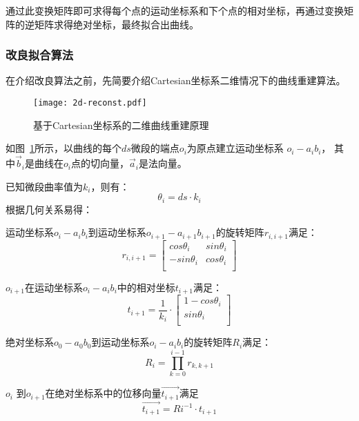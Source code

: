 通过此变换矩阵即可求得每个点的运动坐标系和下个点的相对坐标，再通过变换矩阵的逆矩阵求得绝对坐标\cite{FBG-sensor-devices}，最终拟合出曲线。

\subsubsection{改良拟合算法}

在介绍改良算法之前，先简要介绍Cartesian坐标系二维情况下的曲线重建算法。

\FloatBarrier
\begin{figure}
\centering
\texttt{[image: 2d-reconst.pdf]}
\caption{基于Cartesian坐标系的二维曲线重建原理}
\label{fig:2d-reconst} 
\end{figure}
\FloatBarrier

如图~\ref{fig:2d-reconst}所示，以曲线的每个$ds$微段的端点$o_i$为原点建立运动坐标系 $o_i-a_ib_i$，
其中$\vec b_i$是曲线在$o_i$点的切向量，$\vec a_i$是法向量。

已知微段曲率值为$k_i$，则有：
\begin{equation}
\theta_i = ds\cdot k_i
\end{equation}
根据几何关系易得：

运动坐标系$o_i-a_ib_i$到运动坐标系$o_{i+1}-a_{i+1}b_{i+1}$的旋转矩阵$r_{i, i+1}$满足：
    \begin{equation}
    r_{i, i+1} = \left[
      \begin{matrix}
      cos \theta_i & sin \theta_i\\
      -sin \theta_i & cos \theta_i\\
      \end{matrix}
    \right]
    \end{equation}
    
$o_{i+1}$在运动坐标系$o_i-a_ib_i$中的相对坐标$t_{i+1}$满足：
    \begin{equation}
    t_{i+1} = \frac{1}{k_i} \cdot \left[
      \begin{matrix}
    	1 - cos\theta_i\\
      sin\theta_i\\
      \end{matrix}
    \right]
    \end{equation}
    
绝对坐标系$o_0-a_0b_0$到运动坐标系$o_i-a_ib_i$的旋转矩阵$R_i$满足：
    \begin{equation}
    R_i = \prod_{k = 0}^{i-1} r_{k, k+1}
    \end{equation}

$o_i$ 到$o_{i+1}$在绝对坐标系中的位移向量$\vec{t_{i+1}}$满足
    \begin{equation}
    \vec{t_{i+1}} = Ri^{-1}\cdot t_{i+1}
    \end{equation}
    
